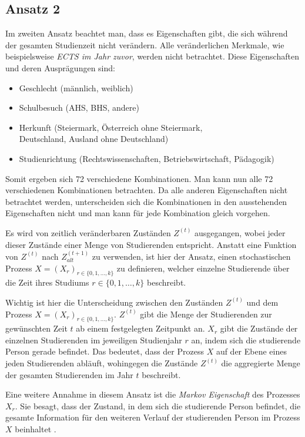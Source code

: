\subsection{Ansatz 2}
\label{sec:appr2}

Im zweiten Ansatz beachtet man, dass es Eigenschaften gibt, die sich w\"ahrend der gesamten Studienzeit nicht verändern. Alle ver\"anderlichen Merkmale,
wie beispielsweise \textit{ECTS im Jahr zuvor}, werden nicht betrachtet.
Diese Eigenschaften und deren Ausprägungen sind:

\begin{itemize}
  \item Geschlecht (männlich, weiblich)
  \item Schulbesuch (AHS, BHS, andere)
  \item Herkunft (Steiermark, Österreich ohne Steiermark, \\
        Deutschland, Ausland ohne Deutschland)
  \item Studienrichtung (Rechtswissenschaften, Betriebswirtschaft, P\"adagogik)
\end{itemize}

Somit ergeben sich 72 verschiedene Kombinationen. Man kann nun alle 72 verschiedenen
Kombinationen betrachten. Da alle anderen Eigenschaften nicht betrachtet werden, unterscheiden sich die Kombinationen in den
ausstehenden Eigenschaften nicht und man kann für jede Kombination gleich vorgehen.

Es wird von zeitlich ver\"anderbaren Zuständen $Z^{(t)}$ ausgegangen, wobei jeder dieser
Zustände einer Menge von Studierenden entspricht. Anstatt eine Funktion von $Z^{(t)}$ nach $Z_{alt}^{(t+1)}$
zu verwenden, ist hier der Ansatz, einen stochastischen Prozess $X = (X_r)_{r \in \{ 0,1, \dots, k \} }$ zu definieren, welcher einzelne Studierende \"uber
die Zeit ihres Studiums $r \in \{0,1, \dots , k\}$ beschreibt.

Wichtig ist hier die Unterscheidung zwischen den Zuständen $Z^{(t)}$ und dem Prozess $X = (X_r)_{r \in \{ 0,1, \dots, k \} }$.
$Z^{(t)}$ gibt die Menge der Studierenden zur gewünschten Zeit $t$ ab einem festgelegten Zeitpunkt an.
$X_r$ gibt die Zustände der einzelnen Studierenden im jeweiligen Studienjahr $r$ an, indem sich die studierende Person gerade befindet.
Das bedeutet, dass der Prozess $X$ auf der Ebene eines jeden Studierenden abläuft, wohingegen
die Zust\"ande $Z^{(t)}$ die aggregierte Menge der gesamten Studierenden im Jahr $t$ beschreibt.

Eine weitere Annahme in diesem Ansatz ist die \textit{Markov Eigenschaft} des Prozesses $X_r$. Sie besagt, dass der Zustand, in dem sich die studierende Person
befindet, die gesamte Information f\"ur den weiteren Verlauf der studierenden Person im Prozess $X$ beinhaltet \cite[Seite 340]{tsitsiklis}.


